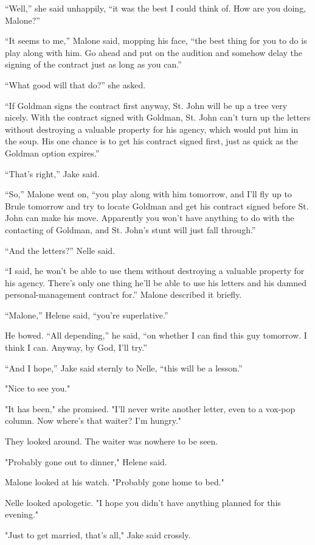 \documentclass{novel}
\begin{document}
“Well,” she said unhappily, “it was the best I could think of. How are you doing, Malone?”

“It seems to me,” Malone said, mopping his face, “the best thing for you to do is play along with him. Go ahead and put on the audition and somehow delay the signing of the contract just as long as you can.”

“What good will that do?” she asked.

“If Goldman signs the contract first anyway, St. John will be up a tree very nicely. With the contract signed with Goldman, St. John can’t turn up the letters without destroying a valuable property for his agency, which would put him in the soup. His one chance is to get his contract signed first, just as quick as the Goldman option expires.”

“That’s right,” Jake said.

“So,” Malone went on, “you play along with him tomorrow, and I’ll fly up to Brule tomorrow and try to locate Goldman and get his contract signed before St. John can make his move. Apparently you won’t have anything to do with the contacting of Goldman, and St. John’s stunt will just fall through.”

“And the letters?” Nelle said.

“I said, he won’t be able to use them without destroying a valuable property for his agency. There’s only one thing he’ll be able to use his letters and his damned personal-management contract for.” Malone described it briefly.

“Malone,” Helene said, “you’re superlative.”

He bowed. “All depending,” he said, “on whether I can find this guy tomorrow. I think I can. Anyway, by God, I’ll try.”

“And I hope,” Jake said sternly to Nelle, “this will be a lesson.”

"Nice to see you."

"It has been," she promised. "I'll never write another letter, even to a vox-pop column. Now where's that waiter? I'm hungry."

They looked around. The waiter was nowhere to be seen.

"Probably gone out to dinner," Helene said.

Malone looked at his watch. "Probably gone home to bed."

Nelle looked apologetic. "I hope you didn't have anything planned for this evening."

"Just to get married, that's all," Jake said crossly.
\end{document}
